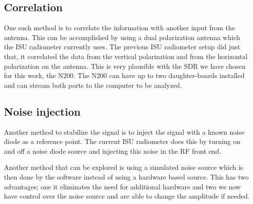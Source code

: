 \subsection{Correlation}  
One such method is to correlate the information with another input from the antenna.  This can be accomplished by using a dual polarization antenna which the ISU radiometer currently uses.  The previous ISU radiometer setup did just that, it correlated the data from the vertical polarization and from the horizontal polarization on the antenna.  This is very plausible with the SDR we have chosen for this work, the N200.  The N200 can have up to two daughter-boards installed and can stream both ports to the computer to be analyzed.  

\subsection{Noise injection}
Another method to stabilize the signal is to inject the signal with a known noise diode as a reference point.  The current ISU radiometer does this by turning on and off a noise diode source and injecting this noise in the RF front end.  

Another method that can be explored is using a simulated noise source which is then done by the software instead of using a hardware based source.  This has two advantages; one it eliminates the need for additional hardware and two we now have control over the noise source and are able to change the amplitude if needed.
